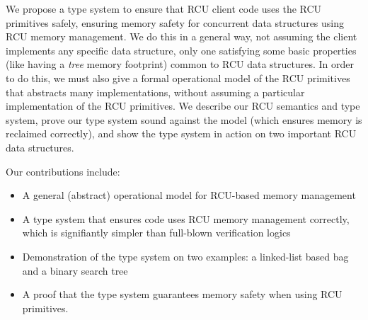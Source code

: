 We propose a type system to ensure that RCU client code uses the RCU primitives safely, ensuring memory safety for concurrent data structures using RCU memory management.
We do this in a general way, not assuming the client implements any specific data structure, only one satisfying some basic properties (like having a \textit{tree} memory footprint) common to RCU data structures.  In order to do this, we must also give a formal operational model of the RCU primitives that abstracts many implementations, without assuming a particular implementation of the RCU primitives.
We describe our RCU semantics and type system, prove our type system sound against the model (which ensures memory is reclaimed correctly), and show the type system in action on two important RCU data structures.

Our contributions include:
\begin{itemize}
\item A general (abstract) operational model for RCU-based memory management
\item A type system that ensures code uses RCU memory management correctly, which is signifiantly simpler than full-blown verification logics
\item Demonstration of the type system on two examples: a linked-list based bag and a binary search tree  
\item A proof that the type system guarantees memory safety when using RCU primitives.
\end{itemize}
